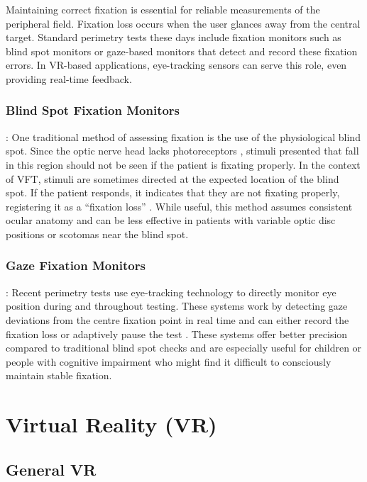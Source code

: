 \documentclass{l4proj}
\begin{document}

Maintaining correct fixation is essential for reliable measurements of the peripheral field. Fixation loss occurs when the user glances away from the central target. Standard perimetry tests these days include fixation monitors such as blind spot monitors or gaze-based monitors that detect and record these fixation errors. In VR-based applications, eye-tracking sensors can serve this role, even providing real-time feedback.

\subsubsection{Blind Spot Fixation Monitors}: \newline
One traditional method of assessing fixation is the use of the physiological blind spot. Since the optic nerve head lacks photoreceptors \citep{vft7}, stimuli presented that fall in this region should not be seen if the patient is fixating properly. In the context of VFT, stimuli are sometimes directed at the expected location of the blind spot. If the patient responds, it indicates that they are not fixating properly, registering it as a “fixation loss” \citep{vft8}. While useful, this method assumes consistent ocular anatomy and can be less effective in patients with variable optic disc positions or scotomas near the blind spot.


\subsubsection{Gaze Fixation Monitors}: \newline
Recent perimetry tests use eye-tracking technology to directly monitor eye position during and throughout testing. These systems work by detecting gaze deviations from the centre fixation point in real time and can either record the fixation loss or adaptively pause the test \citep{vft9}. These systems offer better precision compared to traditional blind spot checks and are especially useful for children or people with cognitive impairment who might find it difficult to consciously maintain stable fixation.

\section{Virtual Reality (VR)}

\subsection{General VR}
\end{document}
